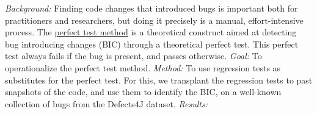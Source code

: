 

\textit{Background:}
Finding code changes that introduced bugs is important both for practitioners and researchers, but doing it precisely is a manual, effort-intensive process. The \underline{perfect test method} is a theoretical construct aimed at detecting bug introducing changes (BIC) through a theoretical perfect test. This perfect test always fails if the bug is present, and passes otherwise.
\textit{Goal:}
To operationalize the perfect test method.
\textit{Method:}
To use regression tests as substitutes for the perfect test. 
For this, we transplant the regression tests to past snapshots of the code, and use them to identify the BIC, on a well-known collection of bugs from the Defects4J dataset. 
\textit{Results:}
